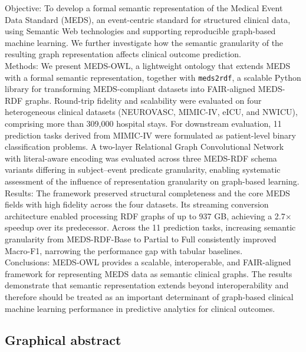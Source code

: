 \begin{paperabstract}

Objective: To develop a formal semantic representation of the Medical Event Data Standard (MEDS), an event-centric standard for structured clinical data, using Semantic Web technologies and supporting reproducible graph-based machine learning. We further investigate how the semantic granularity of the resulting graph representation affects clinical outcome prediction.\\
Methods: We present MEDS-OWL, a lightweight ontology that extends MEDS with a formal semantic representation, together with \texttt{meds2rdf}, a scalable Python library for transforming MEDS-compliant datasets into FAIR-aligned MEDS-RDF graphs. Round-trip fidelity and scalability were evaluated on four heterogeneous clinical datasets (NEUROVASC, MIMIC-IV, eICU, and NWICU), comprising more than 309,000 hospital stays. For downstream evaluation, 11 prediction tasks derived from MIMIC-IV were formulated as patient-level binary classification problems. A two-layer Relational Graph Convolutional Network with literal-aware encoding was evaluated across three MEDS-RDF schema variants differing in subject–event predicate granularity, enabling systematic assessment of the influence of representation granularity on graph-based learning.\\
Results: The framework preserved structural completeness and the core MEDS fields with high fidelity across the four datasets. Its streaming conversion architecture enabled processing RDF graphs of up to 937 GB, achieving a 2.7$\times$ speedup over its predecessor. Across the 11 prediction tasks, increasing semantic granularity from MEDS-RDF-Base to Partial to Full consistently improved Macro-F1, narrowing the performance gap with tabular baselines.\\
Conclusions: MEDS-OWL provides a scalable, interoperable, and FAIR-aligned framework for representing MEDS data as semantic clinical graphs. The results demonstrate that semantic representation extends beyond interoperability and therefore should be treated as an important determinant of graph-based clinical machine learning performance in predictive analytics for clinical outcomes.
\end{paperabstract}

\subsection*{Graphical abstract}

